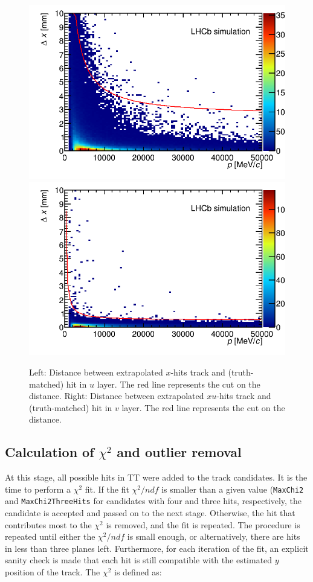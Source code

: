 \begin{figure}[!htbp]
 \begin{center}
  \includegraphics[width=0.49\linewidth]{figures/deltaXULayerCut1.png}
  \includegraphics[width=0.49\linewidth]{figures/deltaXVLayerCut1.png}
   \caption{Left: Distance between extrapolated $x$-hits track and
   (truth-matched) hit in $u$ layer. The red line represents the cut on the
   distance. Right: Distance between extrapolated $xu$-hits track and
   (truth-matched) hit in $v$ layer. The red line represents the cut on the distance.
     \label{fig:uvLayerDist}}
 \end{center}
\end{figure}



\subsection[Calculation of $\chi^{2}$ and outlier removal]{Calculation of {\boldmath$\chi^{2}$} and outlier removal}
\label{sec:chi2}
At this stage, all possible hits in TT were added to the track candidates. It is the time to perform a $\chi^{2}$ fit. If the fit $\chi^{2}/ndf$ is smaller than a given value (\texttt{MaxChi2} and \texttt{MaxChi2ThreeHits} for candidates with four and three hits, respectively, 
the candidate is accepted and passed on to the next stage. Otherwise, the hit that contributes most to the $\chi^{2}$ is removed, and the fit is repeated. 
The procedure is repeated until either the $\chi^{2}/ndf$  is small enough, 
or alternatively, there are hits in less than three planes left.
Furthermore, for each iteration of the fit, an explicit sanity check is made
that each hit is still compatible with the estimated $y$ position of the track.
The $\chi^{2}$ is defined as:

